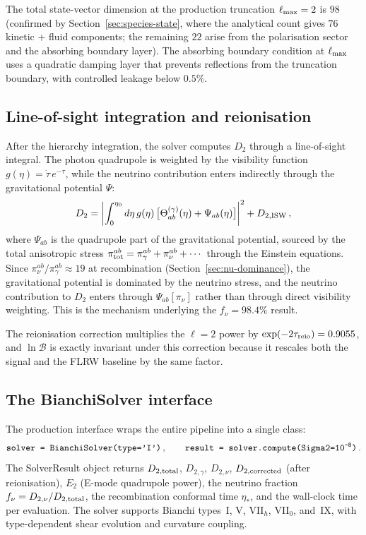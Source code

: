 The total state-vector dimension at the production truncation
$\ell_{\rm max} = 2$ is $98$ (confirmed by
Section~\ref{sec:species-state}, where the analytical count
gives $76$ kinetic + fluid components; the remaining $22$ arise
from the polarisation sector and the absorbing boundary layer).
The absorbing boundary condition at $\ell_{\rm max}$ uses a
quadratic damping layer that prevents reflections from the
truncation boundary, with controlled leakage below $0.5\%$.


\subsection{Line-of-sight integration and reionisation}
\label{sec:solver-los}

After the hierarchy integration, the solver computes $D_2$
through a line-of-sight integral.  The photon quadrupole
is weighted by the visibility function
$g(\eta) = \dot{\tau}\,e^{-\tau}$, while the neutrino
contribution enters indirectly through the gravitational
potential $\Psi$:
\begin{equation}\label{eq:D2-los}
D_2 = \left|
  \int_0^{\eta_0} d\eta\,
  g(\eta)\,\big[
  \Theta^{(\gamma)}_{ab}(\eta)
  + \Psi_{ab}(\eta)
  \big]
\right|^2
+ D_{2,\rm ISW}\,,
\end{equation}
where $\Psi_{ab}$ is the quadrupole part of the
gravitational potential, sourced by the total anisotropic
stress $\pi^{ab}_{\rm tot}
= \pi^{ab}_\gamma + \pi^{ab}_\nu + \cdots$ through
the Einstein equations.  Since
$\pi^{ab}_\nu / \pi^{ab}_\gamma \approx 19$
at recombination
(Section~\ref{sec:nu-dominance}), the gravitational
potential is dominated by the neutrino stress, and the
neutrino contribution to $D_2$ enters through
$\Psi_{ab}[\pi_\nu]$ rather than through direct
visibility weighting.  This is the mechanism underlying
the $f_\nu = 98.4\%$ result.

The reionisation
correction multiplies the $\ell = 2$ power by
$\exp(-2\tau_{\rm reio}) = 0.9055$, and
$\ln \mathcal{B}$ is exactly invariant under this
correction because it rescales both the signal and the
FLRW baseline by the same factor.


\subsection{The BianchiSolver interface}
\label{sec:solver-interface}

The production interface wraps the entire pipeline into a
single class:
\begin{equation}\label{eq:solver-call}
\texttt{solver = BianchiSolver(type='I')}\,,
\qquad
\texttt{result = solver.compute(Sigma2=10\textsuperscript{-8})}\,.
\end{equation}
The {\ttfamily SolverResult} object returns $D_{2,\rm total}$,
$D_{2,\gamma}$, $D_{2,\nu}$, $D_{2,\rm corrected}$ (after
reionisation), $E_2$ (E-mode quadrupole power), the neutrino
fraction $f_\nu = D_{2,\nu}/D_{2,\rm total}$, the
recombination conformal time $\eta_*$, and the wall-clock time
per evaluation.  The solver supports Bianchi types~I, V,
VII$_h$, VII$_0$, and~IX, with type-dependent shear evolution
and curvature coupling.


